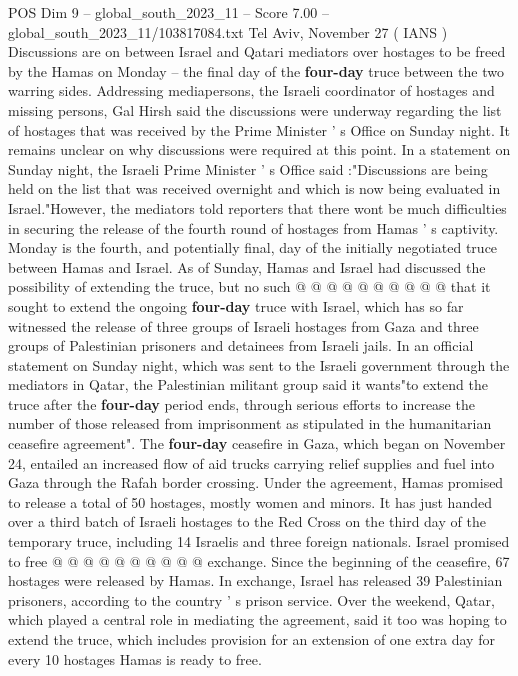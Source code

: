 \begin{textsample}{POS Dim 9 – global\_south\_2023\_11 – Score 7.00 – global\_south\_2023\_11/103817084.txt}  \label{ex:f9_pos_021}
Tel Aviv, November 27 ( IANS ) Discussions are on between Israel and Qatari mediators over hostages to be freed by the Hamas on Monday -- the final day of the \textbf{four-day} truce between the two warring sides.
Addressing mediapersons, the Israeli coordinator of hostages and missing persons, Gal Hirsh said the discussions were underway regarding the list of hostages that was received by the Prime Minister ' s Office on Sunday night.
It remains unclear on why discussions were required at this point.
In a statement on Sunday night, the Israeli Prime Minister ' s Office said :"Discussions are being held on the list that was received overnight and which is now being evaluated in Israel."However, the mediators told reporters that there wont be much difficulties in securing the release of the fourth round of hostages from Hamas ' s captivity.
Monday is the fourth, and potentially final, day of the initially negotiated truce between Hamas and Israel.
As of Sunday, Hamas and Israel had discussed the possibility of extending the truce, but no such @ @ @ @ @ @ @ @ @ @ that it sought to extend the ongoing \textbf{four-day} truce with Israel, which has so far witnessed the release of three groups of Israeli hostages from Gaza and three groups of Palestinian prisoners and detainees from Israeli jails.
In an official statement on Sunday night, which was sent to the Israeli government through the mediators in Qatar, the Palestinian militant group said it wants"to extend the truce after the \textbf{four-day} period ends, through serious efforts to increase the number of those released from imprisonment as stipulated in the humanitarian ceasefire agreement".
The \textbf{four-day} ceasefire in Gaza, which began on November 24, entailed an increased flow of aid trucks carrying relief supplies and fuel into Gaza through the Rafah border crossing.
Under the agreement, Hamas promised to release a total of 50 hostages, mostly women and minors.
It has just handed over a third batch of Israeli hostages to the Red Cross on the third day of the temporary truce, including 14 Israelis and three foreign nationals.
Israel promised to free @ @ @ @ @ @ @ @ @ @ exchange.
Since the beginning of the ceasefire, 67 hostages were released by Hamas.
In exchange, Israel has released 39 Palestinian prisoners, according to the country ' s prison service.
Over the weekend, Qatar, which played a central role in mediating the agreement, said it too was hoping to extend the truce, which includes provision for an extension of one extra day for every 10 hostages Hamas is ready to free.

\end{textsample}
